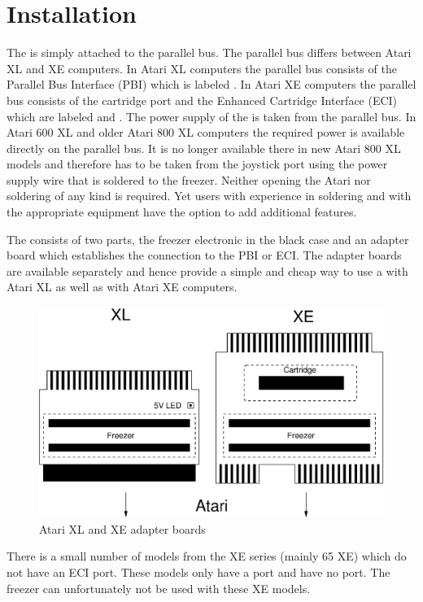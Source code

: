 \chapter{Installation}

The \frz is simply attached to the parallel bus. The parallel bus differs
between Atari XL and XE computers. In Atari XL computers the parallel bus
consists of the Parallel Bus Interface (PBI) which is labeled .
In Atari XE computers the parallel bus consists of the cartridge port and the
Enhanced Cartridge Interface (ECI) which are labeled  and
. The power supply of the \frz is taken from the parallel bus. In
Atari 600 XL and older Atari 800 XL computers the required power is available
directly on the parallel bus. It is no longer available there in new Atari 800
XL models and therefore has to be taken from the joystick port using the
power supply wire that is soldered to the freezer. Neither opening the Atari nor
soldering of any kind is required. Yet users with experience in soldering and with the
appropriate equipment have the option to add additional features.

The \frz consists of two parts, the freezer electronic in the black case and an
adapter board which establishes the connection to the PBI or ECI. The
adapter boards are available separately and hence provide a simple and cheap way
to use a \frz with Atari XL as well as with Atari XE computers.

\begin{figure}[h]
  \centering
  \includegraphics[width=35em]{adapter.eps}
  \caption{Atari XL and XE adapter boards}
\end{figure}

There is a small number of models from the XE series (mainly 65 XE) which do not
have an ECI port. These models only have a  port and have no
 port. The freezer can unfortunately not be used with these XE
models. \newline

